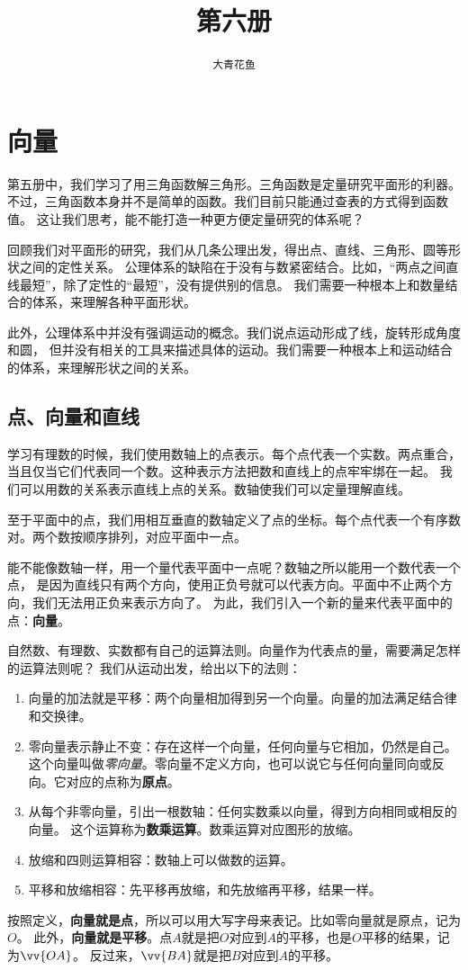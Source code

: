 \documentclass[12pt,UTF8]{ctexbook}
\title{\zihao{0} \bfseries 第六册}
\author{\zihao{2} \texttt{大青花鱼}}
\date{}
\begin{document}
\maketitle
\tableofcontents
\newpage

\chapter{向量}
第五册中，我们学习了用三角函数解三角形。三角函数是定量研究平面形的利器。
不过，三角函数本身并不是简单的函数。我们目前只能通过查表的方式得到函数值。
这让我们思考，能不能打造一种更方便定量研究的体系呢？

回顾我们对平面形的研究，我们从几条公理出发，得出点、直线、三角形、圆等形状之间的定性关系。
公理体系的缺陷在于没有与数紧密结合。比如，“两点之间直线最短”，除了定性的“最短”，没有提供别的信息。
我们需要一种根本上和数量结合的体系，来理解各种平面形状。

此外，公理体系中并没有强调运动的概念。我们说点运动形成了线，旋转形成角度和圆，
但并没有相关的工具来描述具体的运动。我们需要一种根本上和运动结合的体系，来理解形状之间的关系。

\section{点、向量和直线}
学习有理数的时候，我们使用数轴上的点表示。每个点代表一个实数。两点重合，
当且仅当它们代表同一个数。这种表示方法把数和直线上的点牢牢绑在一起。
我们可以用数的关系表示直线上点的关系。数轴使我们可以定量理解直线。

至于平面中的点，我们用相互垂直的数轴定义了点的坐标。每个点代表一个有序数对。两个数按顺序排列，对应平面中一点。

能不能像数轴一样，用一个量代表平面中一点呢？数轴之所以能用一个数代表一个点，
是因为直线只有两个方向，使用正负号就可以代表方向。平面中不止两个方向，我们无法用正负来表示方向了。
为此，我们引入一个新的量来代表平面中的点：\textbf{向量}。

自然数、有理数、实数都有自己的运算法则。向量作为代表点的量，需要满足怎样的运算法则呢？
我们从运动出发，给出以下的法则：
\begin{enumerate}
    \item 向量的加法就是平移：两个向量相加得到另一个向量。向量的加法满足结合律和交换律。
    \item 零向量表示静止不变：存在这样一个向量，任何向量与它相加，仍然是自己。
    这个向量叫做\textsl{零向量}。零向量不定义方向，也可以说它与任何向量同向或反向。它对应的点称为\textbf{原点}。
    \item 从每个非零向量，引出一根数轴：任何实数乘以向量，得到方向相同或相反的向量。
    这个运算称为\textbf{数乘运算}。数乘运算对应图形的放缩。
    \item 放缩和四则运算相容：数轴上可以做数的运算。
    \item 平移和放缩相容：先平移再放缩，和先放缩再平移，结果一样。
\end{enumerate}
按照定义，\textbf{向量就是点}，所以可以用大写字母来表记。比如零向量就是原点，记为$O$。
此外，\textbf{向量就是平移}。点$A$就是把$O$对应到$A$的平移，也是$O$平移的结果，记为$\vv{OA}$。
反过来，$\vv{BA}$就是把$B$对应到$A$的平移。
\end{document}
